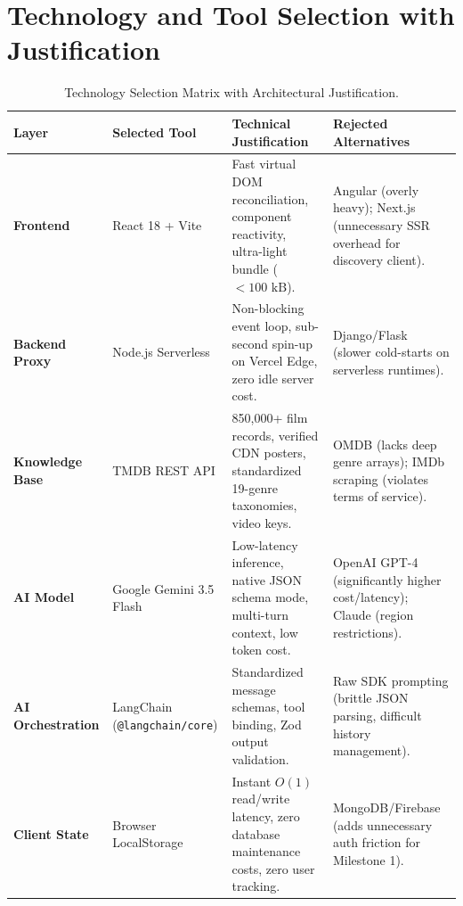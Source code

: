 \documentclass[11pt,a4paper]{article}
\begin{document}
\clearpage
\section{Technology and Tool Selection with Justification}

\begin{table}[H]
\centering
\small
\begin{tabularx}{\textwidth}{p{3.0cm} p{3.2cm} X p{3.5cm}}
\toprule
\rowcolor{tableheader}
\textbf{Layer} & \textbf{Selected Tool} & \textbf{Technical Justification} & \textbf{Rejected Alternatives} \\
\midrule
\textbf{Frontend} & React 18 + Vite & Fast virtual DOM reconciliation, component reactivity, ultra-light bundle ($< 100\text{ kB}$). & Angular (overly heavy); Next.js (unnecessary SSR overhead for discovery client). \\
\addlinespace
\textbf{Backend Proxy} & Node.js Serverless & Non-blocking event loop, sub-second spin-up on Vercel Edge, zero idle server cost. & Django/Flask (slower cold-starts on serverless runtimes). \\
\addlinespace
\textbf{Knowledge Base} & TMDB REST API & 850,000+ film records, verified CDN posters, standardized 19-genre taxonomies, video keys. & OMDB (lacks deep genre arrays); IMDb scraping (violates terms of service). \\
\addlinespace
\textbf{AI Model} & Google Gemini 3.5 Flash & Low-latency inference, native JSON schema mode, multi-turn context, low token cost. & OpenAI GPT-4 (significantly higher cost/latency); Claude (region restrictions). \\
\addlinespace
\textbf{AI Orchestration} & LangChain (\texttt{@langchain/core}) & Standardized message schemas, tool binding, Zod output validation. & Raw SDK prompting (brittle JSON parsing, difficult history management). \\
\addlinespace
\textbf{Client State} & Browser LocalStorage & Instant $O(1)$ read/write latency, zero database maintenance costs, zero user tracking. & MongoDB/Firebase (adds unnecessary auth friction for Milestone 1). \\
\bottomrule
\end{tabularx}
\caption{Technology Selection Matrix with Architectural Justification.}
\label{tab:tech}
\end{table}
\end{document}
